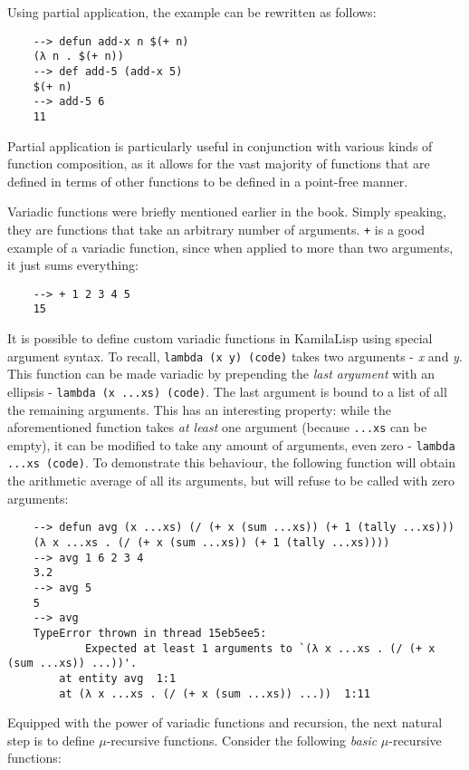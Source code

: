 Using partial application, the example can be rewritten as follows:

\begin{Verbatim}
    --> defun add-x n $(+ n)
    (λ n . $(+ n))
    --> def add-5 (add-x 5)
    $(+ n)
    --> add-5 6
    11
\end{Verbatim}

Partial application is particularly useful in conjunction with various kinds of function composition, as it allows for the vast majority of functions that are defined in terms of other functions to be defined in a point-free manner.

Variadic functions were briefly mentioned earlier in the book. Simply speaking, they are functions that take an arbitrary number of arguments. \verb|+| is a good example of a variadic function, since when applied to more than two arguments, it just sums everything:

\begin{Verbatim}
    --> + 1 2 3 4 5
    15
\end{Verbatim}

It is possible to define custom variadic functions in KamilaLisp using special argument syntax. To recall, \verb|lambda (x y) (code)| takes two arguments - \textit{x} and \textit{y}. This function can be made variadic by prepending the \textit{last argument} with an ellipsis - \verb|lambda (x ...xs) (code)|. The last argument is bound to a list of all the remaining arguments. This has an interesting property: while the aforementioned function takes \textit{at least} one argument (because \verb|...xs| can be empty), it can be modified to take any amount of arguments, even zero - \verb|lambda ...xs (code)|. To demonstrate this behaviour, the following function will obtain the arithmetic average of all its arguments, but will refuse to be called with zero arguments:

\begin{Verbatim}
    --> defun avg (x ...xs) (/ (+ x (sum ...xs)) (+ 1 (tally ...xs)))
    (λ x ...xs . (/ (+ x (sum ...xs)) (+ 1 (tally ...xs))))
    --> avg 1 6 2 3 4
    3.2
    --> avg 5
    5
    --> avg
    TypeError thrown in thread 15eb5ee5:
            Expected at least 1 arguments to `(λ x ...xs . (/ (+ x (sum ...xs)) ...))'.
        at entity avg  1:1
        at (λ x ...xs . (/ (+ x (sum ...xs)) ...))  1:11
\end{Verbatim}

Equipped with the power of variadic functions and recursion, the next natural step is to define $\mu$-recursive functions. Consider the following \textit{basic} $\mu$-recursive functions:

